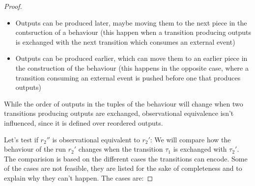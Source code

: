 \begin{proof}
  \begin{itemize}
    \item Outputs can be produced later, maybe moving them to the next piece in the contsruction of a behaviour (this happen when a transition producing outputs is exchanged with the next transition which consumes an external event)
    \item Outputs can be produced earlier, which can move them to an earlier piece in the construction of the behaviour (this happens in the opposite case, where a transition consuming an external event is pushed before one that produces outputs)
  \end{itemize}

  While the order of outputs in the tuples of the behaviour will change when two transitions producing outputs are exchanged, observational equivalence isn't influenced, since it is defined over reordered outputs.

  Let's test if \(r_2''\) is observational equivalent to \(r_2'\):
  We will compare how the behaviour of the run \(r_2'\) changes when the transition \(\tau_1\) is exchanged with \(\tau_2'\).
  The comparision is based on the different cases the transitions can encode.
  Some of the cases are not feasible, they are listed for the sake of completeness and to explain why they can't happen.
  The cases are:


\end{proof}

